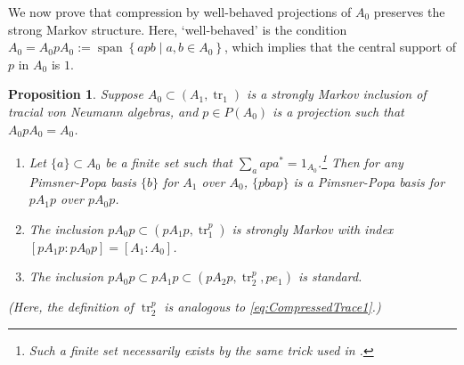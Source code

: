 \documentclass[11pt]{article}
\theoremstyle{plain}
\newtheorem{prop}[thm]{Proposition}
\theoremstyle{definition}
\DeclareMathOperator{\spann}{span}
\DeclareMathOperator{\tr}{tr}
\newcommand{\set}[2]{\left\{#1 \middle| #2\right\}}
\newcommand{\nn}[1]{\textcolor{red}{[[#1]]}}
\begin{document}
We now prove that compression by well-behaved projections of $A_0$ preserves the strong Markov structure.
Here, `well-behaved' is the condition 
$A_0 = A_0 p A_0 := \spann\set{apb}{a,b\in A_0}$,
which implies that the central support of $p$ in $A_0$ is $1$.

\begin{prop}
\label{prop:CompressingStronglyMarkovInclusion}
Suppose $A_0 \subset (A_1, \tr_1)$ is a strongly Markov inclusion of tracial von Neumann algebras, and $p\in P(A_0)$ is a projection such that $A_0pA_0 = A_0$.
\begin{enumerate}[label={\rm(\arabic*)}]
\item
Let $\{a\}\subset A_0$ be a finite set such that $\sum_{a} apa^* = 1_{A_0}$.\footnote{
Such a finite set necessarily exists by the same trick used in \cite[Prop.~3(b)]{MR561983}.
}
Then for any Pimsner-Popa basis $\{b\}$ for $A_1$ over $A_0$, $\{pbap\}$ is a Pimsner-Popa basis for $pA_1p$ over $pA_0p$.
\item
The inclusion $pA_0p \subset (pA_1p, \tr_1^p)$ is strongly Markov with index $[pA_1p:pA_0p] = [A_1:A_0]$.
\item
The inclusion $pA_0p \subset pA_1p \subset (pA_2p , \tr_2^p, pe_1)$ is standard.
\end{enumerate}
(Here, the definition of $\tr^p_2$ is analogous to \eqref{eq:CompressedTrace1}.)
\end{prop}
\end{document}
